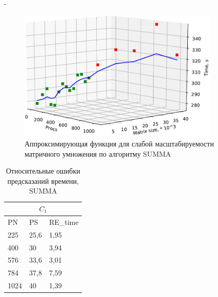 \documentclass[unicode, t, 11pt]{beamer}%
\newlength{\mylen}
\begin{document}
\begin{frame}
\begin{columns}[T]
\begin{column}{\mylen}
		 			\end{column}
		 			\begin{column}{\dimexpr\textwidth-\mylen}
			 			\begin{figure}
			 				\captionsetup{font=tiny, labelfont=tiny}
							\centering
							\includegraphics[width=0.9\textwidth]{./images/ccc}
							\caption{Аппроксимирующая функция для слабой масштабируемости матричного умножения по алгоритму SUMMA}
							\label{graph_SUMMA}
						\end{figure}
						\begin{table}
			 			\captionsetup{font=tiny, labelfont=tiny}
			 			\tiny
							\begin{tabularx}{\textwidth}{|X|X|X|}
							\hline
							\multicolumn{3}{|c|}{\(C_1\)} \\ \hline
							PN   & PS   & RE\_time        \\ \hline
							225  & 25,6 & 1,95            \\ \hline
							400  & 30   & 3,94            \\ \hline
							576  & 33,6 & 3,01            \\ \hline
							784  & 37,8 & 7,59            \\ \hline
							1024 & 40   & 1,39            \\ \hline
							\end{tabularx}
						\caption{Относительные ошибки предсказаний времени, SUMMA}
					\end{table}
					\end{column}
		 		\end{columns}
			\end{frame}
\end{document}
